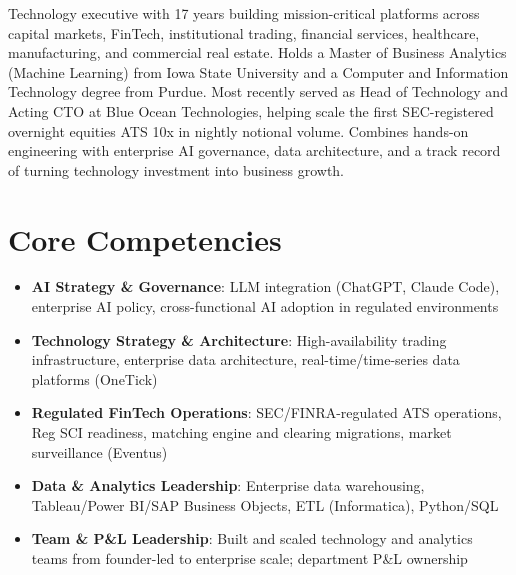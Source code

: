 \documentclass[11pt,a4paper,sans]{moderncv}
\begin{document}
\makecvtitle


\vspace{6pt}
\small{Technology executive with 17 years building mission-critical platforms across capital markets, FinTech, institutional trading, financial services, healthcare, manufacturing, and commercial real estate. Holds a Master of Business Analytics (Machine Learning) from Iowa State University and a Computer and Information Technology degree from Purdue. Most recently served as Head of Technology and Acting CTO at Blue Ocean Technologies, helping scale the first SEC-registered overnight equities ATS 10x in nightly notional volume. Combines hands-on engineering with enterprise AI governance, data architecture, and a track record of turning technology investment into business growth.}


\section{Core Competencies}
\vspace{1pt}
\begin{itemize}

\item \textbf{AI Strategy \& Governance}: LLM integration (ChatGPT, Claude Code), enterprise AI policy, cross-functional AI adoption in regulated environments

\item \textbf{Technology Strategy \& Architecture}: High-availability trading infrastructure, enterprise data architecture, real-time/time-series data platforms (OneTick)

\item \textbf{Regulated FinTech Operations}: SEC/FINRA-regulated ATS operations, Reg SCI readiness, matching engine and clearing migrations, market surveillance (Eventus)

\item \textbf{Data \& Analytics Leadership}: Enterprise data warehousing, Tableau/Power BI/SAP Business Objects, ETL (Informatica), Python/SQL

\item \textbf{Team \& P\&L Leadership}: Built and scaled technology and analytics teams from founder-led to enterprise scale; department P\&L ownership

\end{itemize}
\end{document}
